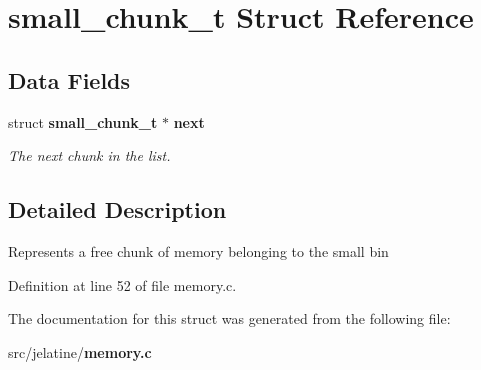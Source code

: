 \section{small\_\-chunk\_\-t Struct Reference}
\label{structsmall__chunk__t}
\subsection*{Data Fields}
\begin{DoxyCompactItemize}
\item 
struct {\bf small\_\-chunk\_\-t} $\ast$ {\bf next}\label{structsmall__chunk__t_acb6c9dc24f1d29f74610678d35efed26}

\begin{DoxyCompactList}\small\item\em The next chunk in the list. \item\end{DoxyCompactList}\end{DoxyCompactItemize}


\subsection{Detailed Description}
Represents a free chunk of memory belonging to the small bin 

Definition at line 52 of file memory.c.



The documentation for this struct was generated from the following file:\begin{DoxyCompactItemize}
\item 
src/jelatine/{\bf memory.c}\end{DoxyCompactItemize}
